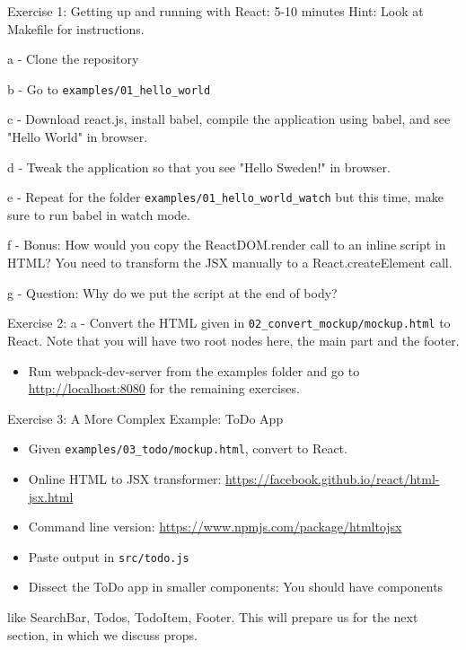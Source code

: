 \documentclass[presentation]{beamer}
\begin{document}
\begin{frame}[fragile,label={sec:orgheadline17}]{Exercise 1: Getting up and running with React: 5-10 minutes}
 Hint: Look at Makefile for instructions.

a - Clone the repository

b - Go to \texttt{examples/01\_hello\_world}

c - Download react.js, install babel, compile the application using babel, and see "Hello World" in browser.

d - Tweak the application so that you see "Hello Sweden!" in browser.

e - Repeat for the folder \texttt{examples/01\_hello\_world\_watch} but this time, make sure to run babel in watch mode.

f - Bonus: How would you copy the ReactDOM.render call to an inline script in HTML? You need to transform the JSX manually to a React.createElement call.

g - Question: Why do we put the script at the end of body?
\end{frame}

\begin{frame}[fragile,label={sec:orgheadline18}]{Exercise 2:}
 a - Convert the HTML given in \texttt{02\_convert\_mockup/mockup.html} to React. Note
that you will have two root nodes here, the main part and the footer.
\begin{itemize}
\item Run webpack-dev-server from the examples folder and go to \url{http://localhost:8080} for the remaining exercises.
\end{itemize}
\end{frame}


\begin{frame}[fragile,label={sec:orgheadline19}]{Exercise 3: A More Complex Example: ToDo App}
 \begin{itemize}
\item Given \texttt{examples/03\_todo/mockup.html}, convert to React.
\item Online HTML to JSX transformer:
\url{https://facebook.github.io/react/html-jsx.html}
\item Command line version: \url{https://www.npmjs.com/package/htmltojsx}
\item Paste output in \texttt{src/todo.js}
\item Dissect the ToDo app in smaller components: You should have components
\end{itemize}
like SearchBar, Todos, TodoItem, Footer. This will prepare us for the next
section, in which we discuss props.
\end{frame}
\end{document}
